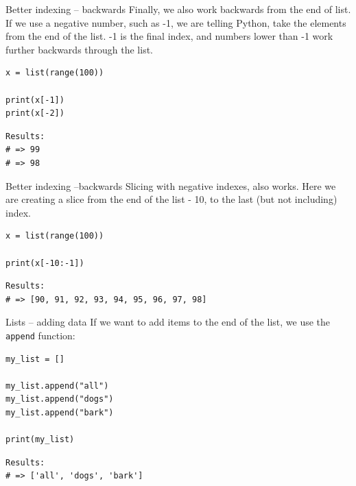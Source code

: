 \documentclass[10pt]{beamer}
\begin{document}
\begin{frame}[label={sec:org048b51c},fragile]{Better indexing -- backwards}
 Finally, we also work backwards from the end of list. If we use a negative number,
such as -1, we are telling Python, take the elements from the end of the list. -1 is
the final index, and numbers lower than -1 work further backwards through the list.

\begin{verbatim}
x = list(range(100))

print(x[-1])
print(x[-2])
\end{verbatim}

\begin{verbatim}
Results: 
# => 99
# => 98
\end{verbatim}
\end{frame}

\begin{frame}[label={sec:org74f74d9},fragile]{Better indexing --backwards}
 Slicing with negative indexes, also works. Here we are creating a slice from the end
of the list - 10, to the last (but not including) index.

\begin{verbatim}
x = list(range(100))

print(x[-10:-1])
\end{verbatim}

\begin{verbatim}
Results: 
# => [90, 91, 92, 93, 94, 95, 96, 97, 98]
\end{verbatim}
\end{frame}

\begin{frame}[label={sec:org26de6ee},fragile]{Lists -- adding data}
 If we want to add items to the end of the list, we use the \texttt{append} function:

\begin{verbatim}
my_list = []

my_list.append("all")
my_list.append("dogs")
my_list.append("bark")

print(my_list)
\end{verbatim}

\begin{verbatim}
Results: 
# => ['all', 'dogs', 'bark']
\end{verbatim}
\end{frame}
\end{document}
